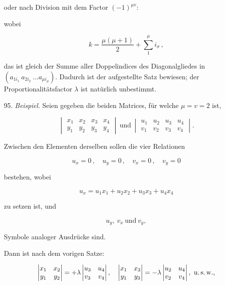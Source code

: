 oder nach Division mit dem Factor $(-1)^{\mu v}$:


wobei

\[
k = \frac{\mu(\mu+1)}{2} + \sum_{1}^{\mu} i_\sigma\,,
\]

das ist gleich der Summe aller Doppelindices des Diagonalgliedes in $(a_{1i_1}\ a_{2i_2}\ \ldots a_{\mu i_\mu})$. Dadurch ist der aufgestellte Satz bewiesen; der Proportionalit\"atsfactor $\lambda$ ist nat\"urlich unbestimmt.

95. \textit{Beispiel.} Seien gegeben die beiden Matrices, f\"ur welche $\mu = v = 2$ ist,

\[
\begin{vmatrix}
x_1 & x_2 & x_3 & x_4 \\
y_1 & y_2 & y_3 & y_4
\end{vmatrix}
\ \text{und}\
\begin{vmatrix}
u_1 & u_2 & u_3 & u_4 \\
v_1 & v_2 & v_3 & v_4
\end{vmatrix}.
\]

Zwischen den Elementen derselben sollen die vier Relationen

\[
u_x = 0\,,\quad u_y = 0\,,\quad v_x = 0\,,\quad v_y = 0
\]

bestehen, wobei

\[
u_x = u_1 x_1 + u_2 x_2 + u_3 x_3 + u_4 x_4
\]

zu setzen ist, und

\[
u_y,\ v_x\ \text{und}\ v_y,
\]

Symbole analoger Ausdr\"ucke sind.

Dann ist nach dem vorigen Satze:

\[
\begin{vmatrix}
x_1 & x_2 \\
y_1 & y_2
\end{vmatrix}
= +\lambda
\begin{vmatrix}
u_3 & u_4 \\
v_3 & v_4
\end{vmatrix},\quad
\begin{vmatrix}
x_1 & x_3 \\
y_1 & y_3
\end{vmatrix}
= -\lambda
\begin{vmatrix}
u_2 & u_4 \\
v_2 & v_4
\end{vmatrix},\ \text{u.\,s.\,w.,}
\]


